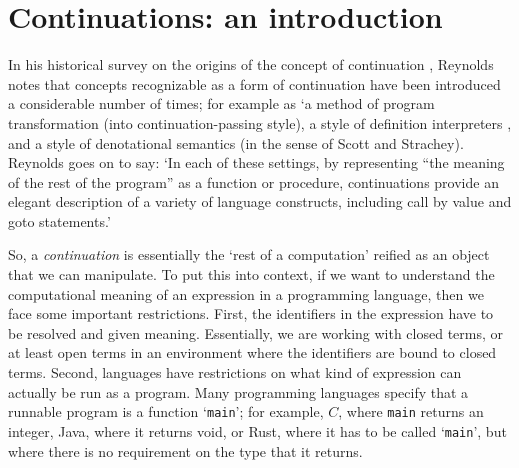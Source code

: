 \documentclass{sn-jnl}
\newcommand{\note}[1]{\textcolor{red} {[DP-Note: {#1}]}}
\begin{document}
\section{Continuations: an introduction}\label{sec:Continuations}





In his historical survey on the origins of the concept of continuation \cite{reynolds1993discoveries}, Reynolds notes that concepts recognizable as a form of continuation have been introduced a considerable number of times; for example as `a method of program transformation (into continuation-passing style), a style of definition interpreters 
\cite{Reynolds1972}, and a style of denotational semantics (in the sense of Scott and Strachey). Reynolds goes on to say: `In each of these settings, by representing ``the meaning of the rest of the program'' as a function or procedure, continuations provide an elegant description of a variety of language constructs, including call by value and goto statements.'

So, a \emph{continuation} is essentially the `rest of a computation' reified as an object that we can manipulate. 
To put this into context, if 
we want to understand the computational meaning of an expression in 
a programming language, then we face some important restrictions. 
First, the identifiers in the expression have to be resolved 
and given meaning. Essentially, we are working with closed terms, or 
at least open terms in an environment where the identifiers are 
bound to closed terms. Second, languages have restrictions on what 
kind of expression can actually be run as a program. Many programming 
languages specify that a runnable program is a function `\texttt{main}';  
for example, $C$, where \texttt{main} returns an integer, Java, where it returns void, or Rust, where it has to be called `\texttt{main}', but where there is no requirement on the type that it returns.  
\end{document}
